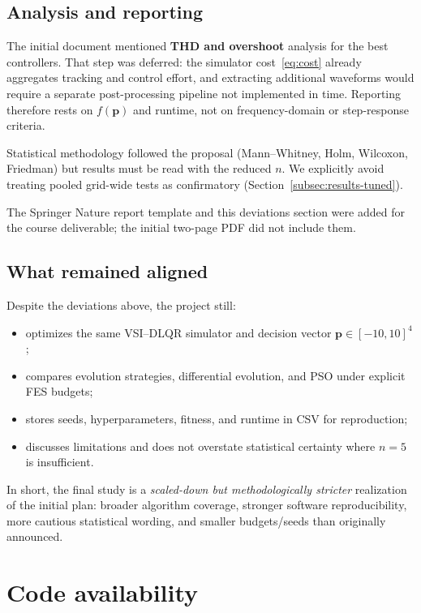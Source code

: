 \documentclass[pdflatex,sn-mathphys-num]{sn-jnl}
\begin{document}
\subsection{Analysis and reporting}

The initial document mentioned \textbf{THD and overshoot} analysis for the best controllers.
That step was deferred: the simulator cost~\eqref{eq:cost} already aggregates tracking and control effort, and extracting additional waveforms would require a separate post-processing pipeline not implemented in time.
Reporting therefore rests on $f(\mathbf{p})$ and runtime, not on frequency-domain or step-response criteria.

Statistical methodology followed the proposal (Mann--Whitney, Holm, Wilcoxon, Friedman) but results must be read with the reduced $n$.
We explicitly avoid treating pooled grid-wide tests as confirmatory (Section~\ref{subsec:results-tuned}).

The Springer Nature report template and this deviations section were added for the course deliverable; the initial two-page PDF did not include them.

\subsection{What remained aligned}

Despite the deviations above, the project still:
\begin{itemize}
  \item optimizes the same VSI--DLQR simulator and decision vector $\mathbf{p}\in[-10,10]^4$;
  \item compares evolution strategies, differential evolution, and PSO under explicit FES budgets;
  \item stores seeds, hyperparameters, fitness, and runtime in CSV for reproduction;
  \item discusses limitations and does not overstate statistical certainty where $n=5$ is insufficient.
\end{itemize}

In short, the final study is a \emph{scaled-down but methodologically stricter} realization of the initial plan: broader algorithm coverage, stronger software reproducibility, more cautious statistical wording, and smaller budgets/seeds than originally announced.

\section*{Code availability}
\end{document}
